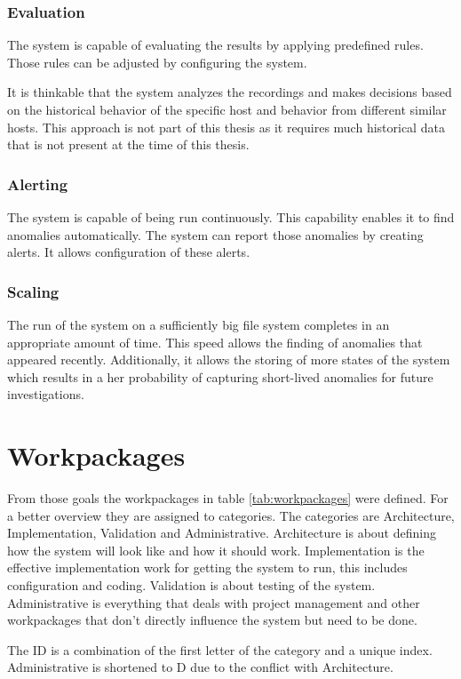 \documentclass[
	a4paper,					%
	10pt,							%
	twoside,					%
	openright,				%
	notitlepage,			%
	parskip=half,			%
]{scrreprt}					%
\begin{document}
\subsubsection{Evaluation}
The system is capable of evaluating the results by applying predefined rules. Those rules can be adjusted by configuring the system.

It is thinkable that the system analyzes the recordings and makes decisions based on the historical behavior of the specific host and behavior from different similar hosts. This approach is not part of this thesis as it requires much historical data that is not present at the time of this thesis. 

\subsubsection{Alerting}
The system is capable of being run continuously. This capability enables it to find anomalies automatically. The system can report those anomalies by creating alerts. It allows configuration of these alerts.

\subsubsection{Scaling}
The run of the system on a sufficiently big file system completes in an appropriate amount of time. This speed allows the finding of anomalies that appeared recently. Additionally, it allows the storing of more states of the system which results in a her probability of capturing short-lived anomalies for future investigations. 

\section{Workpackages}

From those goals the workpackages in table \ref{tab:workpackages} were defined. For a better overview they are assigned to categories. The categories are Architecture, Implementation, Validation and Administrative. Architecture is about defining how the system will look like and how it should work. Implementation is the effective implementation work for getting the system to run, this includes configuration and coding. Validation is about testing of the system. Administrative is everything that deals with project management and other workpackages that don't directly influence the system but need to be done.

The ID is a combination of the first letter of the category and a unique index. Administrative is shortened to D due to the conflict with Architecture.
\end{document}
